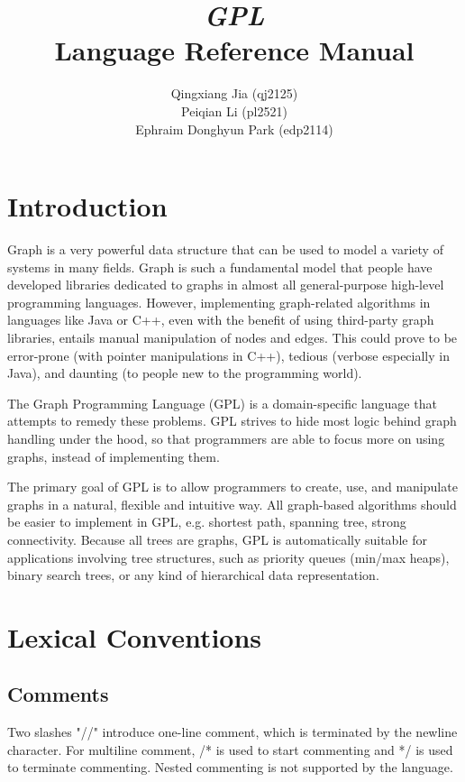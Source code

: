 \documentclass[a4paper,12pt]{article}
\begin{document}
\title{\textit{GPL} \\ Language Reference Manual}
\author{Qingxiang Jia (qj2125)\\ Peiqian Li (pl2521)\\ Ephraim Donghyun Park (edp2114)}
\maketitle
\tableofcontents
\newpage

\section{Introduction}
Graph is a very powerful data structure that can be used to model a variety of systems in many fields.  Graph is such a fundamental model that people have developed libraries dedicated to graphs in almost all general-purpose high-level programming languages.  However, implementing graph-related algorithms in languages like Java or C++, even with the benefit of using third-party graph libraries, entails manual manipulation of nodes and edges.  This could prove to be error-prone (with pointer manipulations in C++), tedious (verbose especially in Java), and daunting (to people new to the programming world).

The Graph Programming Language (GPL) is a domain-specific language that attempts to remedy these problems.  GPL strives to hide most logic behind graph handling under the hood, so that programmers are able to focus more on using graphs, instead of implementing them.

The primary goal of GPL is to allow programmers to create, use, and manipulate graphs in a natural, flexible and intuitive way. All graph-based algorithms should be easier to implement in GPL, e.g. shortest path, spanning tree, strong connectivity. Because all trees are graphs, GPL is automatically suitable for applications involving tree structures, such as priority queues (min/max heaps), binary search trees, or any kind of hierarchical data representation.

\section{Lexical Conventions}
\subsection{Comments}
Two slashes "//" introduce one-line comment, which is terminated by the newline character. For multiline comment, /* is used to start commenting and */ is used to terminate commenting. Nested commenting is not supported by the language.
\end{document}
